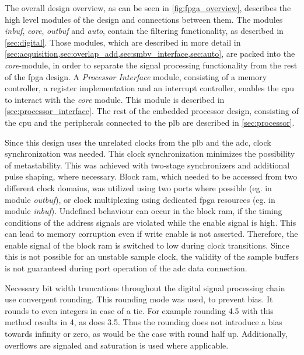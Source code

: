 \documentclass[12pt,a4paper,parskip=full,abstract=true,BCOR=12mm,twoside,open=right]{scrreprt}
\def\device#1{\textit{#1}}
\begin{document}
The overall design overview, as can be seen in \cref{fig:fpga_overview}, describes
the high level modules of the design and connections between them. The modules \device{inbuf},
\device{core}, \device{outbuf} and \device{auto}, contain the filtering functionality, as described in
\cref{sec:digital}. Those modules, which are described in more detail in \cref{sec:acquisition,sec:overlap_add,sec:smbv_interface,sec:auto},
are packed into the \device{core}-module, in order to separate the signal processing functionality from
the rest of the \gls{fpga} design. A \device{Processor Interface} module, consisting of a memory controller,
a register implementation and an interrupt controller, enables the \gls{cpu} to interact with the
\device{core} module. This module is described in \cref{sec:processor_interface}.
The rest of the embedded processor design, consisting of the \gls{cpu} and the
peripherals connected to the \gls{plb} are described in \cref{sec:processor}.

Since this design uses the unrelated clocks from the \gls{plb} and the
\gls{adc}, clock synchronization was needed. This clock synchronization minimizes
the possibility of metastability. This was achieved with two-stage synchronizers and
additional pulse shaping, where necessary. Block
\gls{ram}, which needed to be accessed from two different clock domains, was
utilized using two ports where possible (eg. in module \device{outbuf}), or
clock multiplexing using dedicated \gls{fpga} resources (eg. in module \device{inbuf}). Undefined behaviour
can occur in the block \gls{ram}, if the timing conditions of the address signals are violated
while the enable signal is high. This can lead to memory corruption
even if write enable is not asserted\cite{virtex5}. Therefore, the
enable signal of the block \gls{ram} is switched to low during clock transitions.
Since this is not possible for an unstable sample clock, the validity of
the sample buffers is not guaranteed during port operation of the \gls{adc} data connection.

Necessary bit width truncations throughout the digital signal processing chain use
convergent rounding. This rounding mode was used, to prevent bias. It rounds
to even integers in case of a tie. For example rounding 4.5 with this method
results in 4, as does 3.5. Thus the rounding does not introduce a bias towards infinity or zero, as would
be the case with round half up. Additionally, overflows are signaled and saturation is
used where applicable.
\end{document}
